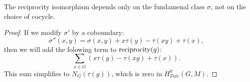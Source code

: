 \begin{lemma}
	The reciprocity isomorphism depends only on the fundamenal class $\sigma$,
	not on the choice of cocycle.
\end{lemma}

\begin{proof}
	If we modify $\sigma'$ by a coboundary:
	\[
		\sigma''(x,y) = \sigma(x,y) + x \tau(y) - \tau(xy) + \tau(x),
	\]
	then we will add the folowing term to $\mathrm{reciprocity}(g)$:
	\[
		\sum_{x \in G} (x \tau(g) - \tau(xg) + \tau(x)).
	\]
	This sum simplifies to $N_G(\tau(g))$, which is zero in $H^0_{Tate}(G,M)$.
\end{proof}
